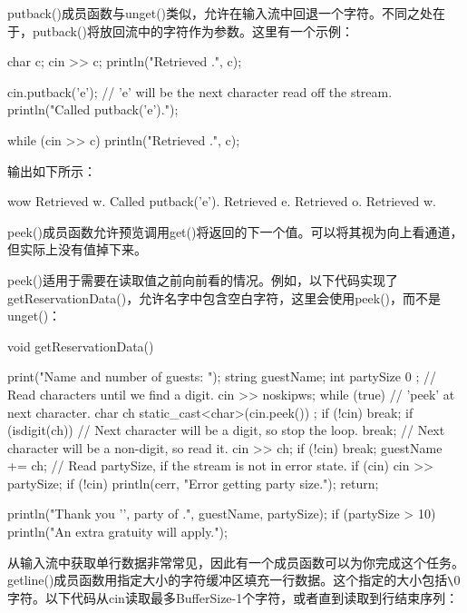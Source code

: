 
putback()成员函数与unget()类似，允许在输入流中回退一个字符。不同之处在于，putback()将放回流中的字符作为参数。这里有一个示例：

\begin{cpp}
char c;
cin >> c;
println("Retrieved {}.", c);

cin.putback('e'); // 'e' will be the next character read off the stream.
println("Called putback('e').");

while (cin >> c) { println("Retrieved {}.", c); }
\end{cpp}

输出如下所示：

\begin{shell}
wow
Retrieved w.
Called putback('e').
Retrieved e.
Retrieved o.
Retrieved w.
\end{shell}


peek()成员函数允许预览调用get()将返回的下一个值。可以将其视为向上看通道，但实际上没有值掉下来。

peek()适用于需要在读取值之前向前看的情况。例如，以下代码实现了getReservationData()，允许名字中包含空白字符，这里会使用peek()，而不是unget()：

\begin{cpp}
void getReservationData()
{
    print("Name and number of guests: ");
    string guestName;
    int partySize { 0 };
    // Read characters until we find a digit.
    cin >> noskipws;
    while (true) {
        // 'peek' at next character.
        char ch { static_cast<char>(cin.peek()) };
        if (!cin) { break; }
        if (isdigit(ch)) {
            // Next character will be a digit, so stop the loop.
            break;
        }
        // Next character will be a non-digit, so read it.
        cin >> ch;
        if (!cin) { break; }
        guestName += ch;
    }
    // Read partySize, if the stream is not in error state.
    if (cin) { cin >> partySize; }
    if (!cin) {
        println(cerr, "Error getting party size.");
        return;
    }

    println("Thank you '{}', party of {}.", guestName, partySize);
    if (partySize > 10) {
        println("An extra gratuity will apply.");
    }
}
\end{cpp}


从输入流中获取单行数据非常常见，因此有一个成员函数可以为你完成这个任务。getline()成员函数用指定大小的字符缓冲区填充一行数据。这个指定的大小包括\verb|\|0字符。以下代码从cin读取最多BufferSize-1个字符，或者直到读取到行结束序列：


